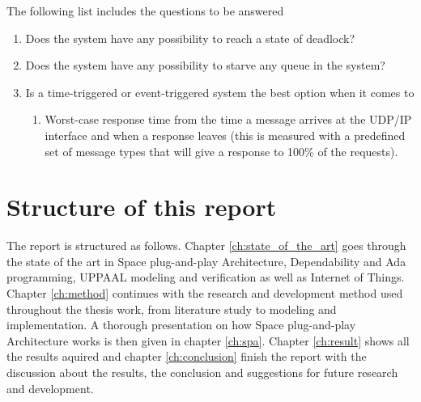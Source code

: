 The following list includes the questions to be answered
\begin{enumerate}
    \item Does the system have any possibility to reach a state of deadlock?
    \item Does the system have any possibility to starve any queue in the
        system?
    \item Is a time-triggered or event-triggered system the best option when it comes to
        \begin{enumerate}
            \item Worst-case response time from the time a message arrives at
                the UDP/IP interface and when a response leaves (this is
                measured with a predefined set of message types that will give
                a response to 100\% of the requests).
        \end{enumerate}
\end{enumerate}

\section{Structure of this report}
The report is structured as follows. Chapter \ref{ch:state_of_the_art} goes
through the state of the art in Space plug-and-play Architecture, Dependability
and Ada programming, UPPAAL modeling and verification as well as Internet of
Things.  Chapter \ref{ch:method} continues with the research and development
method used throughout the thesis work, from literature study to modeling and
implementation. A thorough presentation on how Space plug-and-play Architecture 
works is then given in chapter \ref{ch:spa}. Chapter \ref{ch:result} shows all
the results aquired and chapter \ref{ch:conclusion} finish the report with the
discussion about the results, the conclusion and suggestions for future
research and development.

